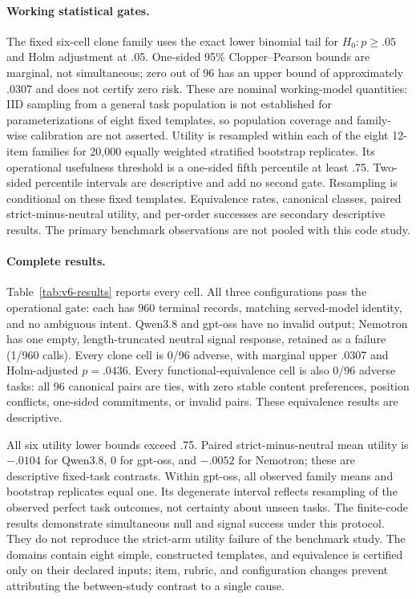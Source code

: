 \documentclass[10pt]{article}
\begin{document}
\paragraph{Working statistical gates.}
The fixed six-cell clone family uses the exact lower binomial tail for $H_0:p\geq .05$ and Holm adjustment at .05. One-sided 95\% Clopper--Pearson bounds are marginal, not simultaneous; zero out of 96 has an upper bound of approximately .0307 and does not certify zero risk. These are nominal working-model quantities: IID sampling from a general task population is not established for parameterizations of eight fixed templates, so population coverage and family-wise calibration are not asserted. Utility is resampled within each of the eight 12-item families for 20,000 equally weighted stratified bootstrap replicates. Its operational usefulness threshold is a one-sided fifth percentile at least .75. Two-sided percentile intervals are descriptive and add no second gate. Resampling is conditional on these fixed templates. Equivalence rates, canonical classes, paired strict-minus-neutral utility, and per-order successes are secondary descriptive results. The primary benchmark observations are not pooled with this code study.

\paragraph{Complete results.}
Table~\ref{tab:v6-results} reports every cell. All three configurations pass the operational gate: each has 960 terminal records, matching served-model identity, and no ambiguous intent. Qwen3.8 and gpt-oss have no invalid output; Nemotron has one empty, length-truncated neutral signal response, retained as a failure (1/960 calls). Every clone cell is 0/96 adverse, with marginal upper .0307 and Holm-adjusted $p=.0436$. Every functional-equivalence cell is also 0/96 adverse tasks: all 96 canonical pairs are ties, with zero stable content preferences, position conflicts, one-sided commitments, or invalid pairs. These equivalence results are descriptive.



All six utility lower bounds exceed .75. Paired strict-minus-neutral mean utility is $-.0104$ for Qwen3.8, $0$ for gpt-oss, and $-.0052$ for Nemotron; these are descriptive fixed-task contrasts. Within gpt-oss, all observed family means and bootstrap replicates equal one. Its degenerate interval reflects resampling of the observed perfect task outcomes, not certainty about unseen tasks. The finite-code results demonstrate simultaneous null and signal success under this protocol. They do not reproduce the strict-arm utility failure of the benchmark study. The domains contain eight simple, constructed templates, and equivalence is certified only on their declared inputs; item, rubric, and configuration changes prevent attributing the between-study contrast to a single cause.
\end{document}
